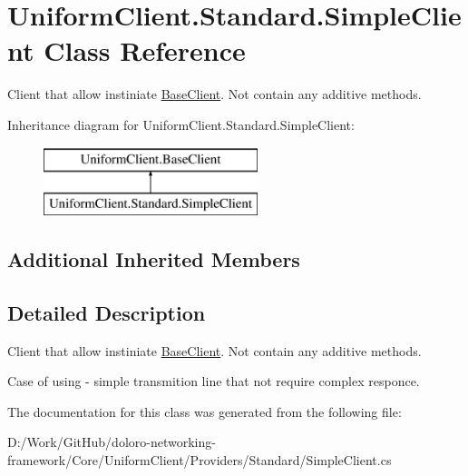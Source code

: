 \hypertarget{class_uniform_client_1_1_standard_1_1_simple_client}{}\section{Uniform\+Client.\+Standard.\+Simple\+Client Class Reference}
\label{class_uniform_client_1_1_standard_1_1_simple_client}


Client that allow instiniate \mbox{\hyperlink{class_uniform_client_1_1_base_client}{Base\+Client}}. Not contain any additive methods.  


Inheritance diagram for Uniform\+Client.\+Standard.\+Simple\+Client\+:\begin{figure}[H]
\begin{center}
\leavevmode
\includegraphics[height=2.000000cm]{d0/d21/class_uniform_client_1_1_standard_1_1_simple_client}
\end{center}
\end{figure}
\subsection*{Additional Inherited Members}


\subsection{Detailed Description}
Client that allow instiniate \mbox{\hyperlink{class_uniform_client_1_1_base_client}{Base\+Client}}. Not contain any additive methods. 

Case of using -\/ simple transmition line that not require complex responce. 

The documentation for this class was generated from the following file\+:\begin{DoxyCompactItemize}
\item 
D\+:/\+Work/\+Git\+Hub/doloro-\/networking-\/framework/\+Core/\+Uniform\+Client/\+Providers/\+Standard/Simple\+Client.\+cs\end{DoxyCompactItemize}
